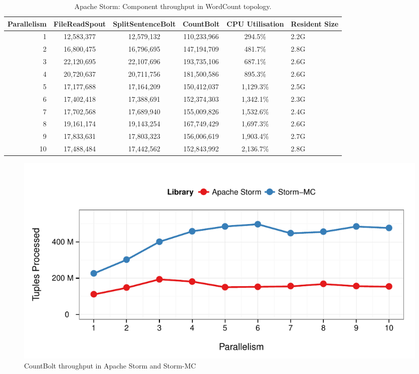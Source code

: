 \documentclass[bsc,deptreport,twoside,singlespacing,normalheadings,parskip]{infthesis}\usepackage[]{graphicx}\usepackage[]{color}
\makeatletter
\def\maxwidth{ %
  \ifdim\Gin@nat@width>\linewidth
    \linewidth
  \else
    \Gin@nat@width
  \fi
}
\newenvironment{knitrout}{}{} %
\makeatother
\begin{document}
\begin{table}[!htb]
\begin{adjustwidth}{-0.5in}{-0.5in}
\centering
\small
\begin{tabular}{@{}rccccl@{}}
    \textbf{Parallelism} & \textbf{FileReadSpout} & \textbf{SplitSentenceBolt} & \textbf{CountBolt} & \textbf{CPU Utilisation} & \textbf{Resident Size} \\ \toprule
    1 & {12,583,377} & {12,579,132} & {110,233,966} & {294.5\%} & {2.2G} \\
    2 & {16,800,475} & {16,796,695} & {147,194,709} & {481.7\%} & {2.8G} \\
    3 & {22,120,695} & {22,107,696} & {193,735,106} & {687.1\%} & {2.6G} \\
    4 & {20,720,637} & {20,711,756} & {181,500,586} & {895.3\%} & {2.6G} \\
	5 & {17,177,688} & {17,164,209} & {150,412,037} & {1,129.3\%} & {2.5G} \\
	6 & {17,402,418} & {17,388,691} & {152,374,303} & {1,342.1\%} & {2.3G} \\
	7 & {17,702,568} & {17,689,940} & {155,009,826} & {1,532.6\%} & {2.4G} \\
	8 & {19,161,174} & {19,143,254} & {167,749,429} & {1,697.3\%} & {2.6G} \\
	9 & {17,833,631} & {17,803,323} & {156,006,619} & {1,903.4\%} & {2.7G} \\
	10 & {17,488,484} & {17,442,562} & {152,843,992} & {2,136.7\%} & {2.8G} \\
\end{tabular}
\caption{Apache Storm: Component throughput in WordCount topology.}
\label{table:storm_wordcount}
\end{adjustwidth}
\end{table}

\begin{knitrout}
\color{fgcolor}\begin{figure}[!htb]

{\centering \includegraphics[width=\maxwidth]{figure/countbolt-plot-1} 

}

\caption[CountBolt throughput in Apache Storm and Storm-MC]{CountBolt throughput in Apache Storm and Storm-MC}\label{fig:countbolt-plot}
\end{figure}


\end{knitrout}
\end{document}
